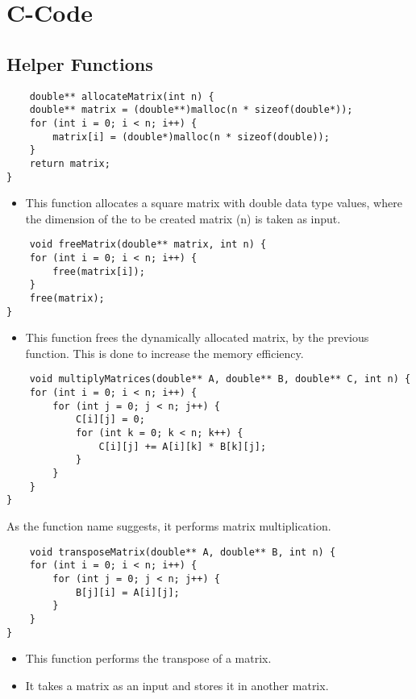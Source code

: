 \documentclass{article}
\begin{document}
\section{C-Code}
\subsection{Helper Functions}
\begin{lstlisting}
    double** allocateMatrix(int n) {
    double** matrix = (double**)malloc(n * sizeof(double*));
    for (int i = 0; i < n; i++) {
        matrix[i] = (double*)malloc(n * sizeof(double));
    }
    return matrix;
}
\end{lstlisting}
\begin{itemize}
\item This function allocates a square matrix with double data type values, where the dimension of the to be created matrix (n) is taken as input.
\end{itemize}
\begin{lstlisting}
    void freeMatrix(double** matrix, int n) {
    for (int i = 0; i < n; i++) {
        free(matrix[i]);
    }
    free(matrix);
}
\end{lstlisting}
\begin{itemize}
\item This function frees the dynamically allocated matrix, by the previous function. This is done to increase the memory efficiency.
\end{itemize}
\begin{lstlisting}
    void multiplyMatrices(double** A, double** B, double** C, int n) {
    for (int i = 0; i < n; i++) {
        for (int j = 0; j < n; j++) {
            C[i][j] = 0;
            for (int k = 0; k < n; k++) {
                C[i][j] += A[i][k] * B[k][j];
            }
        }
    }
}
\end{lstlisting}
As the function name suggests, it performs matrix multiplication.
\begin{lstlisting}
    void transposeMatrix(double** A, double** B, int n) {
    for (int i = 0; i < n; i++) {
        for (int j = 0; j < n; j++) {
            B[j][i] = A[i][j];
        }
    }
}
\end{lstlisting}
\begin{itemize}
\item This function performs the transpose of a matrix.
\item It takes a matrix as an input and stores it in another matrix.
\end{itemize}
\end{document}
